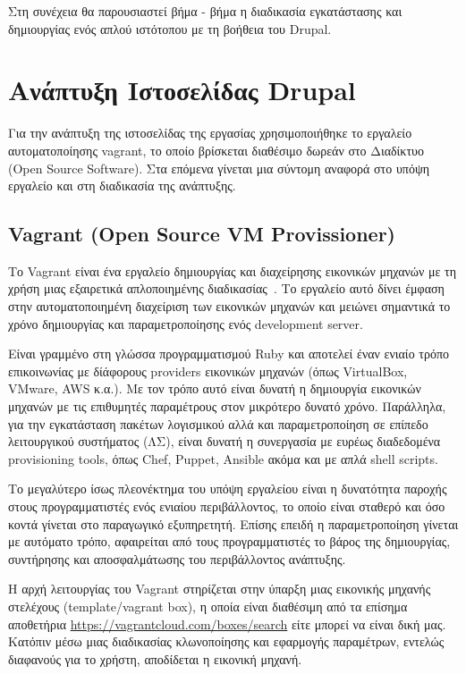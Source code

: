 \documentclass[12pt]{report}
\begin{document}
Στη συνέχεια θα παρουσιαστεί βήμα - βήμα η διαδικασία εγκατάστασης και δημιουργίας ενός απλού ιστότοπου με τη βοήθεια του \textlatin{Drupal}.

\chapter{Ανάπτυξη Ιστοσελίδας \textlatin{Drupal}}\label{ch3}
Για την ανάπτυξη της ιστοσελίδας της εργασίας χρησιμοποιήθηκε το εργαλείο αυτοματοποίησης \textlatin{vagrant}, το οποίο βρίσκεται διαθέσιμο δωρεάν στο Διαδίκτυο (\textlatin{Open Source Software}). Στα επόμενα γίνεται μια σύντομη αναφορά στο υπόψη εργαλείο και στη διαδικασία της ανάπτυξης.

\section{\textlatin{\textlatin{Vagrant (Open Source VM Provissioner)}}}\label{vagrant}
Το \textlatin{Vagrant} είναι ένα εργαλείο δημιουργίας και διαχείρησης εικονικών μηχανών με τη χρήση μιας εξαιρετικά απλοποιημένης διαδικασίας~\cite{vagrant_by_hashicorp}. Το εργαλείο αυτό δίνει έμφαση στην αυτοματοποιημένη διαχείριση των εικονικών μηχανών και μειώνει σημαντικά το χρόνο δημιουργίας και παραμετροποίησης ενός \textlatin{development server}.

Είναι γραμμένο στη γλώσσα προγραμματισμού \textlatin{Ruby} και αποτελεί έναν ενιαίο τρόπο επικοινωνίας με δίάφορους \textlatin{providers} εικονικών μηχανών (όπως \textlatin{VirtualBox, VMware, AWS} κ.α.). Με τον τρόπο αυτό είναι δυνατή η δημιουργία εικονικών μηχανών με τις επιθυμητές παραμέτρους στον μικρότερο δυνατό χρόνο. Παράλληλα, για την εγκατάσταση πακέτων λογισμικού αλλά και παραμετροποίηση σε επίπεδο λειτουργικού συστήματος (ΛΣ), είναι δυνατή η συνεργασία με ευρέως διαδεδομένα \textlatin{provisioning tools}, όπως \textlatin{Chef, Puppet, Ansible} ακόμα και με απλά \textlatin{shell scripts}.

Το μεγαλύτερο ίσως πλεονέκτημα του υπόψη εργαλείου είναι η δυνατότητα παροχής στους προγραμματιστές ενός ενιαίου περιβάλλοντος, το οποίο είναι σταθερό και όσο κοντά γίνεται στο παραγωγικό εξυπηρετητή. Επίσης επειδή η παραμετροποίηση γίνεται με αυτόματο τρόπο, αφαιρείται από τους προγραμματιστές το βάρος της δημιουργίας, συντήρησης και αποσφαλμάτωσης του περιβάλλοντος ανάπτυξης.

Η αρχή λειτουργίας του \textlatin{Vagrant} στηρίζεται στην ύπαρξη μιας εικονικής μηχανής στελέχους (\textlatin{template/vagrant box}), η οποία είναι διαθέσιμη από τα επίσημα αποθετήρια \textlatin{\url{https://vagrantcloud.com/boxes/search}} είτε μπορεί να είναι δική μας. Κατόπιν μέσω μιας διαδικασίας κλωνοποίησης και εφαρμογής παραμέτρων, εντελώς διαφανούς για το χρήστη, αποδίδεται η εικονική μηχανή.
\end{document}
